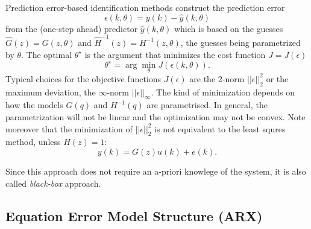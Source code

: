 Prediction error-based identification methods construct the prediction error
\begin{equation*}
  \epsilon(k,\theta) = y(k) - \hat{y}(k,\theta)
\end{equation*}
from the (one-step ahead) predictor $\hat{y}(k,\theta)$ which is based on the guesses $\hat{G}(z)=G(z,\theta)$ and $\hat{H}^{-1}(z)=H^{-1}(z,\theta)$, the guesses being parametrized by $\theta$. The optimal $\theta^\star$ is the argument that minimizes the cost function $J=J(\epsilon)$
\begin{equation*}
  \theta^\star = \arg \min_\theta J(\epsilon(k,\theta)).
\end{equation*}
Typical choices for the objective functions $J(\epsilon)$ are the 2-norm $||\epsilon||_2^2$ or the maximum deviation, the $\infty$-norm $||\epsilon||_\infty$. The kind of minimization depends on how the models $G(q)$ and $H^{-1}(q)$ are parametrised. In general, the parametrization will not be linear and the optimization may not be convex. Note moreover that the minimization of $||\epsilon||_2^2$ is not equivalent to the least squres method, unless  $H(z)=1$:
\begin{equation*}
  y(k) = G(z)u(k) + e(k).
\end{equation*}

Since this approach does not require an a-priori knowlege of the system, it is also called \emph{black-box} approach.

\subsection{Equation Error Model Structure (ARX)}
\label{sec:ARX}



